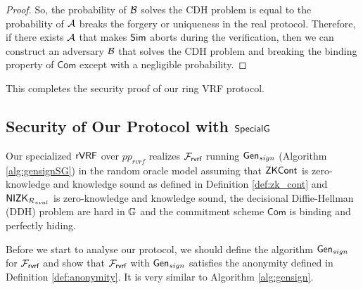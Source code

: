 \begin{proof}
	So, the probability of $ \mathcal{B} $ solves the CDH problem is equal to the probability of $ \mathcal{A} $ breaks the forgery or uniqueness in the real protocol. Therefore,  if there exists $ \mathcal{A} $ that makes $ \mathsf{Sim}$ aborts during the verification, then we can construct an adversary $ \mathcal{B} $ that solves the CDH problem and breaking the binding property of $ \mathsf{Com} $ except with a negligible probability.
	
	
	
\end{proof}
This completes the security proof of our ring VRF protocol.\eprint{ \qed}{}



\subsection{Security of Our Protocol with $ {\mathsf{SpecialG}} $}
\label{ap:secondprotocolproof}
\begin{theorem}
Our specialized $ {\mathsf{rVRF}} $   over  $ pp_{rvrf} $ realizes $ \mathcal{F}_{\textsf{rvrf}} $ running $ \mathsf{Gen}_{sign} $ (Algorithm \ref{alg:gensignSG}) \cite{canetti1,canetti2} in the random oracle model assuming that ${\mathsf{ZKCont}} $ is zero-knowledge and knowledge sound as defined in Definition \ref{def:zk_cont} and $ {\mathsf{NIZK}}_{\mathcal{R}_{eval}} $ is zero-knowledge and knowledge sound, the decisional Diffie-Hellman (DDH) problem are hard in $ {\mathbb{G}}  $  and the commitment scheme $ \mathsf{Com} $ is binding and perfectly hiding. 
\end{theorem}

Before we start to analyse our protocol, we should define the algorithm $ \mathsf{Gen}_{sign} $  for $ \mathcal{F}_{\textsf{rvrf}} $ and show that $ \mathcal{F}_{\textsf{rvrf}} $ with $ \mathsf{Gen}_{sign} $ satisfies the anonymity defined in Definition \ref{def:anonymity}. It is very similar to Algorithm \ref{alg:gensign}.


